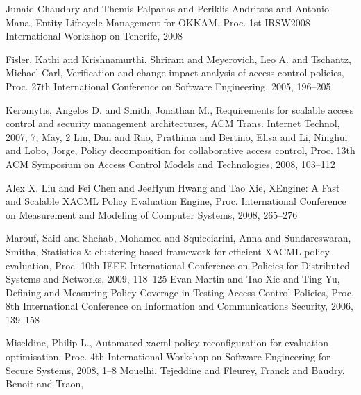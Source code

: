 \documentclass{acm_proc_article-sp}
\begin{document}
%


%
%










\begin{thebibliography}{1}
Junaid Chaudhry and Themis Palpanas and Periklis Andritsos and Antonio
	Mana,
Entity Lifecycle Management for OKKAM,
Proc. 1st IRSW2008 International Workshop on Tenerife,
2008

Fisler, Kathi and Krishnamurthi, Shriram and Meyerovich, Leo A. and
	Tschantz, Michael Carl,
Verification and change-impact analysis of access-control policies,
Proc. 27th International Conference on Software Engineering,
2005, 196--205

Keromytis, Angelos D. and Smith, Jonathan M.,
Requirements for scalable access control and security management
	architectures, ACM Trans. Internet Technol,
2007,
7,
May,
2
Lin, Dan and Rao, Prathima and Bertino, Elisa and Li, Ninghui and
	Lobo, Jorge,
Policy decomposition for collaborative access control,
Proc. 13th ACM Symposium on Access Control Models and Technologies,
2008,
103--112

Alex X. Liu and Fei Chen and JeeHyun Hwang and Tao Xie,
XEngine: A Fast and Scalable {XACML} Policy Evaluation Engine,
Proc. International Conference on Measurement and Modeling of Computer
	Systems,
2008,
265--276

Marouf, Said and Shehab, Mohamed and Squicciarini, Anna and Sundareswaran,
	Smitha,
Statistics \& clustering based framework for efficient XACML policy
	evaluation,
Proc. 10th IEEE International Conference on Policies for Distributed
	Systems and Networks,
2009,
118--125
Evan Martin and Tao Xie and Ting Yu,
Defining and Measuring Policy Coverage in Testing Access Control
	Policies,
Proc. 8th International Conference on Information and Communications
	Security,
2006,
139--158

Miseldine, Philip L.,
Automated xacml policy reconfiguration for evaluation optimisation,
Proc. 4th International Workshop on Software Engineering for Secure
	Systems,
2008,
1--8
Mouelhi, Tejeddine and Fleurey, Franck and Baudry, Benoit and Traon,


\end{thebibliography}
\end{document}
